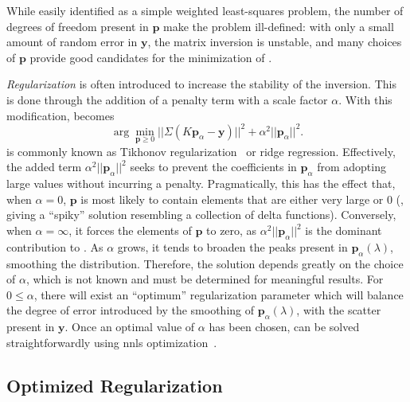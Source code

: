 While easily identified as a simple weighted least-squares problem, the number of degrees of freedom present in $\mathbf{p}$ make the problem ill-defined: with only a small amount of random error in $\mathbf{y}$, the matrix inversion is unstable, and many choices of $\mathbf{p}$ provide good candidates for the minimization of . 

\emph{Regularization} is often introduced to increase the stability of the inversion.
This is done through the addition of a penalty term with a scale factor $\alpha$.
With this modification,  becomes
%
\begin{equation}
\label{eq:rnnls}
   \arg \min_{\mathbf{p} \geq 0} || \Sigma(K \mathbf{p}_\alpha - \mathbf{y}) ||^{2} + \alpha^2 || \mathbf{p}_\alpha ||^{2} .
\end{equation}
%
 is commonly known as Tikhonov regularization~\cite{1995-Tikhonov-NMSIPP} or ridge regression.
Effectively, the added term $\alpha^2 || \mathbf{p}_\alpha ||^{2}$ seeks to prevent the coefficients in $\mathbf{p}_\alpha$ from adopting large values without incurring a penalty.
Pragmatically, this has the effect that, when $\alpha = 0$, $\mathbf{p}$ is most likely to contain elements that are either very large or 0 (, giving a ``spiky'' solution resembling a collection of delta functions).
Conversely, when $\alpha = \infty$, it forces the elements of $\mathbf{p}$ to zero, as $\alpha^2 || \mathbf{p}_\alpha ||^{2}$ is the dominant contribution to .
As $\alpha$ grows, it tends to broaden the peaks present in $\mathbf{p}_\alpha(\lambda)$, smoothing the distribution. Therefore, the solution depends greatly on the choice of $\alpha$, which is not known  and must be determined for meaningful results. For $0 \leq \alpha$, there will exist an ``optimum'' regularization parameter which will balance the degree of error introduced by the smoothing of $\mathbf{p}_\alpha(\lambda)$, with the scatter present in $\mathbf{y}$. Once an optimal value of $\alpha$ has been chosen,  can be solved straightforwardly using \gls{nnls} optimization~\cite{1995-Lawson-SLSP}.

\subsection{Optimized Regularization}


